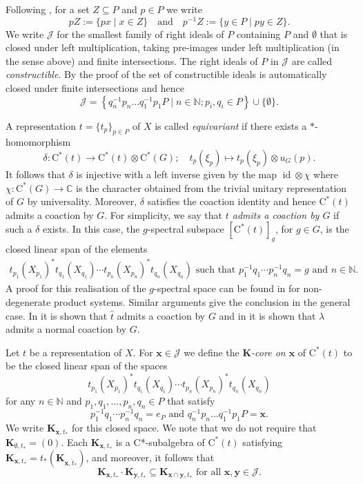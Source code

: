 \documentclass[11pt,final]{amsart}
\numberwithin{equation}{section}
\theoremstyle{plain}
\theoremstyle{definition}
\theoremstyle{remark}
\newcommand{\J}{{\mathcal{J}}}
\def\de{\delta}
\def\la{\lambda}
\newcommand{\bC}{\mathbb{C}}
\newcommand{\bN}{\mathbb{N}}
\newcommand{\foral}{\text{ for all }}
\newcommand{\qand}{\quad\text{and}\quad}
\newcommand{\ca}{\mathrm{C}^*}
\newcommand{\wh}{\widehat}
\newcommand{\id}{{\operatorname{id}}}
\newcommand{\mt}{\emptyset}
\newcommand{\bo}[1]{\mathbf{#1}} %
\begin{document}
Following \cite{Li12}, for a set $Z \subseteq P$ and $p \in P$ we write
\[
pZ:=\{px \mid x \in Z\}
\qand
p^{-1}Z := \{y \in P \mid py \in Z\}.
\]
We write $\J$ for the smallest family of right ideals of $P$ containing $P$ and $\mt$ that is closed under left multiplication, taking pre-images under left multiplication (in the sense above) and finite intersections.
The right ideals of $P$ in $\J$ are called \emph{constructible}.
By the proof of \cite[Lemma~3.3]{Li12} the set of constructible ideals is automatically closed under finite intersections and hence
\[
\J = \left\{ q_n^{-1} p_n \dots q_1^{-1} p_1 P \mid n \in \bN; p_i, q_i \in P \right\} \cup \{\mt\}.
\]

A representation $t = \{t_p\}_{p \in P}$ of $X$ is called \emph{equivariant} if there exists a $*$-homomorphism
\[
\de \colon \ca(t) \to \ca(t) \otimes \ca(G) ; \quad  t_p(\xi_p) \mapsto t_p(\xi_p) \otimes u_{G}(p).
\]
It follows that $\de$ is injective with a left inverse given by the map $\id \otimes \chi$ where $\chi \colon \ca(G)\to \bC$ is the character obtained from the trivial unitary representation of $G$ by universality.
Moreover, $\de$ satisfies the coaction identity and hence $\ca(t)$ admits a coaction by $G$.
For simplicity, we say that \emph{$t$ admits a coaction by $G$} if such a $\de$ exists. 
In this case, the $g$-spectral subspace $[\ca(t)]_g$, for $g \in G$, is the closed linear span of the elements
\begin{align*}
 t_{p_1}(X_{p_1})^* t_{q_1}(X_{q_1}) \cdots t_{p_n}(X_{p_n})^*t_{q_n} (X_{q_n})
\text{ such that } 
p_1^{-1} q_1 \cdots p_n^{-1} q_n = g \text{ and } n \in \bN.
\end{align*}
A proof for this realisation of the $g$-spectral space can be found in \cite[Lemma~2.2]{Seh19} for non-degenerate product systems. Similar arguments give the conclusion in the general case. In \cite[Lemma~2.2]{Seh19} it is shown that $\wh{t}$ admits a coaction by $G$ and in \cite[Proposition~4.1]{DKKLL22} it is shown that $\la$ admits a normal coaction by $G$.

Let $t$ be a representation of $X$.
For $\bo{x} \in \J$ we define the \emph{$\bo{K}$-core on $\bo{x}$} of $\ca(t)$ to be the closed linear span of the spaces
\[
t_{p_1}(X_{p_1})^*  t_{q_1}(X_{q_1}) \cdots t_{p_n}(X_{p_n})^* 
t_{q_n} (X_{q_n})
\]
for any $n\in\bN$ and $p_1, q_1, \dots, p_n, q_n \in P$ that satisfy
\[
p_1^{-1} q_1 \cdots p_n^{-1} q_n = e_P
\text{ and }
q_n^{-1} p_n \dots q_1^{-1} p_1 P = \bo{x}.
\]
We write $\bo{K}_{\bo{x}, t_\ast}$ for this closed space.
We note that we do not require that $\bo{K}_{\mt, t_{\ast}} = (0)$.
Each $\bo{K}_{\bo{x}, t_\ast}$ is a C*-subalgebra of $\ca(t)$ satisfying $\bo{K}_{\bo{x}, t_\ast}=t_\ast(\bo{K}_{\bo{x}, \wh{t}_\ast})$, and moreover, it follows that  
\[
\bo{K}_{\bo{x}, t_\ast} \cdot \bo{K}_{\bo{y}, t_\ast} \subseteq \bo{K}_{\bo{x}\cap \bo{y}, t_\ast} \foral \bo{x}, \bo{y} \in \J.
\]
\end{document}
